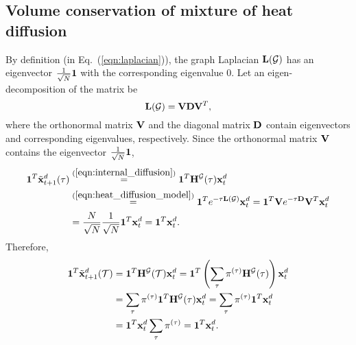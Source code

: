 \documentclass[journal]{IEEEtran}
\begin{document}
\subsection{Volume conservation of mixture of heat diffusion}\label{apdx:volume_conservation_heat_diffusion}
By definition (in Eq.~(\ref{eqn:laplacian})), the graph Laplacian ${\bf{L}}(\mathcal{G})$ has an eigenvector $\frac{1}{\sqrt{N}}{\bf{1}}$ with the corresponding eigenvalue $0$. Let an eigen-decomposition of the matrix be
\begin{equation}
    {\bf{L}}(\mathcal{G})={\bf{V}}{\bf{D}}{\bf{V}}^T,
\end{equation}
where the orthonormal matrix ${\bf{V}}$ and the diagonal matrix ${\bf{D}}$ contain eigenvectors and corresponding eigenvalues, respectively.
Since the orthonormal matrix ${\bf{V}}$ contains the eigenvector $\frac{1}{\sqrt{N}}{\bf{1}}$,
\begin{equation}
\begin{aligned}
{\bf{1}}^T\tilde{\bf{x}}^d_{t+1}(\tau)&\overset{(\ref{eqn:internal_diffusion})}{=}{\bf{1}}^T{\bf{H}}^{\mathcal{G}}(\tau){\bf{x}}^d_{t}\\
&\overset{(\ref{eqn:heat_diffusion_model})}{=}{\bf{1}}^T e^{-\tau{\bf{L}}(\mathcal{G})}{\bf{x}}_t^d={\bf{1}}^T{\bf{V}} e^{-\tau{\bf{D}}}{\bf{V}}^T{\bf{x}}_t^d\\
&=\frac{N}{\sqrt{N}}\frac{1}{\sqrt{N}}{\bf{1}}^T{\bf{x}}_t^d={\bf{1}}^T{\bf{x}}_t^d.
\end{aligned}
\end{equation}
Therefore,
\begin{equation}
    \begin{aligned}
    {\bf{1}}^T\tilde{\bf{x}}^d_{t+1}(\mathcal{T})&={\bf{1}}^T{\bf{H}}^{\mathcal{G}}(\mathcal{T}){\bf{x}}^d_{t}={\bf{1}}^T\left(\sum_\tau \pi^{(\tau)}{\bf{H}}^{\mathcal{G}}(\tau)\right){\bf{x}}^d_{t}\\
    &=\sum_\tau \pi^{(\tau)}{\bf{1}}^T{\bf{H}}^{\mathcal{G}}(\tau){\bf{x}}^d_{t}=\sum_\tau \pi^{(\tau)}{\bf{1}}^T{\bf{x}}^d_{t}\\
    &={\bf{1}}^T{\bf{x}}^d_{t}\sum_\tau \pi^{(\tau)}={\bf{1}}^T{\bf{x}}^d_{t}.
    \end{aligned}
\end{equation}
\end{document}
